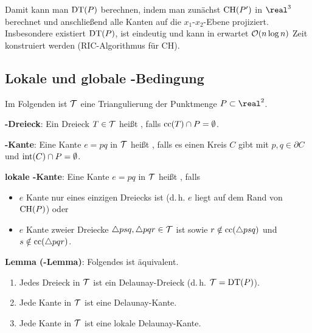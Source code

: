 Damit kann man $\operatorname{DT}(P)$ berechnen, indem man zunächst $\operatorname{CH}(P')$ in $\real^3$ berechnet
und anschließend alle Kanten auf die $x_1$-$x_2$-Ebene projiziert.
Insbesondere existiert $\operatorname{DT}(P)$, ist eindeutig
und kann in erwartet $\mathcal{O}(n \log n)$ Zeit konstruiert werden (RIC-Algorithmus für CH).

\subsection{%
    Lokale und globale -Bedingung%
}

Im Folgenden ist $\mathcal{T}$ eine Triangulierung der Punktmenge $P \subset \real^2$.

\textbf{-Dreieck}:
Ein Dreieck $T \in \mathcal{T}$ heißt , falls $\operatorname{cc}(T) \cap P = \emptyset$.

\textbf{-Kante}:
Eine Kante $e = pq$ in $\mathcal{T}$ heißt , falls es einen Kreis $C$ gibt
mit $p, q \in \partial C$ und $\operatorname{int}(C) \cap P = \emptyset$.

\textbf{lokale -Kante}:
Eine Kante $e = pq$ in $\mathcal{T}$ heißt , falls
\begin{itemize}
    \item
    $e$ Kante nur eines einzigen Dreiecks ist
    (d.\,h. $e$ liegt auf dem Rand von $\operatorname{CH}(P)$) oder

    \item
    $e$ Kante zweier Dreiecke $\triangle psq, \triangle pqr \in \mathcal{T}$ ist sowie
    $r \notin \operatorname{cc}(\triangle psq)$ und $s \notin \operatorname{cc}(\triangle pqr)$.
\end{itemize}

\linie

\textbf{Lemma (-Lemma)}:
Folgendes ist äquivalent.
\begin{enumerate}
    \item
    Jedes Dreieck in $\mathcal{T}$ ist ein Delaunay-Dreieck (d.\,h. $\mathcal{T} = \operatorname{DT}(P)$).

    \item
    Jede Kante in $\mathcal{T}$ ist eine Delaunay-Kante.

    \item
    Jede Kante in $\mathcal{T}$ ist eine lokale Delaunay-Kante.
\end{enumerate}


